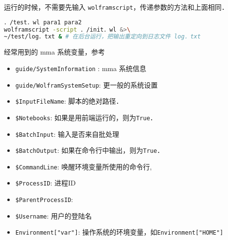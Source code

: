 运行的时候，不需要先输入 \verb`wolframscript`，传递参数的方法和上面相同．

\begin{lstlisting}[language=bash]
．/test．wl para1 para2
wolframscript -script ．/init．wl &>\
~/test/log．txt & # 在后台运行，把输出重定向到日志文件 log．txt
\end{lstlisting}

经常用到的 mma 系统变量，参考

\begin{itemize}
\item \verb`guide/SystemInformation` : mma 系统信息
\item \verb`guide/WolframSystemSetup`: 更一般的系统设置
\item \verb`$InputFileName`: 脚本的绝对路径．
\item \verb`$Notebooks`: 如果是用前端运行的，则为\verb`True`．
\item \verb`$BatchInput`: 输入是否来自批处理
\item \verb`$BatchOutput`: 如果在命令行中输出，则为\verb`True`．
\item \verb`$CommandLine`: 唤醒环境变量所使用的命令行,
\item \verb`$ProcessID`: 进程ID
\item \verb`$ParentProcessID`:
\item \verb`$Username`: 用户的登陆名
\item \verb`Environment["var"]`: 操作系统的环境变量，如\verb`Environment["HOME"]`
\end{itemize}
